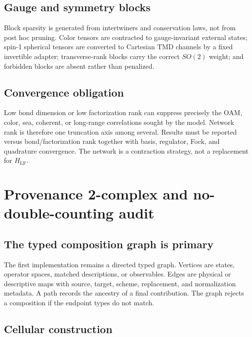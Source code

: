 \documentclass[11pt]{article}
\newcommand{\LF}{\mathrm{LF}}
\begin{document}
\subsection{Gauge and symmetry blocks}

Block sparsity is generated from intertwiners and conservation laws, not from
post hoc pruning.  Color tensors are contracted to gauge-invariant external
states; spin-1 spherical tensors are converted to Cartesian TMD channels by a
fixed invertible adapter; transverse-rank blocks carry the correct
\(SO(2)\) weight; and forbidden blocks are absent rather than penalized.

\subsection{Convergence obligation}

Low bond dimension or low factorization rank can suppress precisely the OAM,
color, sea, coherent, or long-range correlations sought by the model.
Network rank is therefore one truncation axis among several.  Results must be
reported versus bond/factorization rank together with basis, regulator, Fock,
and quadrature convergence.  The network is a contraction strategy, not a
replacement for \(H_{\LF}\).

\section{Provenance 2-complex and no-double-counting audit}
\label{sec:provenance}

\subsection{The typed composition graph is primary}

The first implementation remains a directed typed graph.  Vertices are
states, operator spaces, matched descriptions, or observables.  Edges are
physical or descriptive maps with source, target, scheme, replacement, and
normalization metadata.  A path records the ancestry of a final contribution.
The graph rejects a composition if the endpoint types do not match.

\subsection{Cellular construction}
\end{document}
